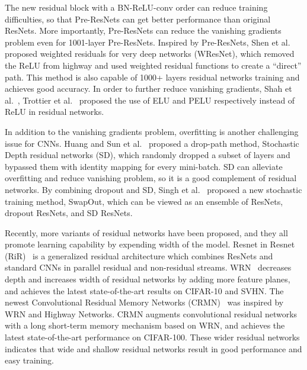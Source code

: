 \documentclass[journal]{IEEEtran}
\begin{document}
The new residual block with a BN-ReLU-conv order can reduce training difficulties, so that Pre-ResNets can get better performance than original ResNets. More importantly, Pre-ResNets can reduce the vanishing gradients problem even for 1001-layer Pre-ResNets. Inspired by Pre-ResNets, Shen et al.~\cite{shen2016wresnets} proposed weighted residuals for very deep networks (WResNet), which removed the ReLU from highway and used weighted residual functions to create a ``direct'' path. This method is also capable of 1000+ layers residual networks training and achieves good accuracy. In order to further reduce vanishing gradients, Shah et al.~\cite{shah2016elu}, Trottier et al.~\cite{trottier2016pelu} proposed the use of ELU and PELU respectively instead of ReLU in residual networks. 
\par 
In addition to the vanishing gradients problem, overfitting is another challenging issue for CNNs. Huang and Sun et al.~\cite{huang2016SD} proposed a drop-path method, Stochastic Depth residual networks (SD), which randomly dropped a subset of layers and bypassed them with identity mapping for every mini-batch. SD can alleviate overfitting and reduce vanishing problem, so it is a good complement of residual networks. By combining dropout and SD, Singh et al.~\cite{singh2016swapout} proposed a new stochastic training method, SwapOut, which can be viewed as an ensemble of ResNets, dropout ResNets, and SD ResNets. 
\par
Recently, more variants of residual networks have been proposed, and they all promote learning capability by expending width of the model. Resnet in Resnet (RiR)~\cite{targ2016rir} is a generalized residual architecture which combines ResNets and standard CNNs in parallel residual and non-residual streams. WRN~\cite{zagoruyko2016wrn} decreases depth and increases width of residual networks by adding more feature planes, and achieves the latest state-of-the-art results on CIFAR-10 and SVHN. The newest Convolutional Residual Memory Networks (CRMN)~\cite{moniz2016crmn} was inspired by WRN and Highway Networks. CRMN augments convolutional residual networks with a long short-term memory mechanism based on WRN, and achieves the latest state-of-the-art performance on CIFAR-100. These wider residual networks indicates that wide and shallow residual networks result in good performance and easy training. 
\end{document}
